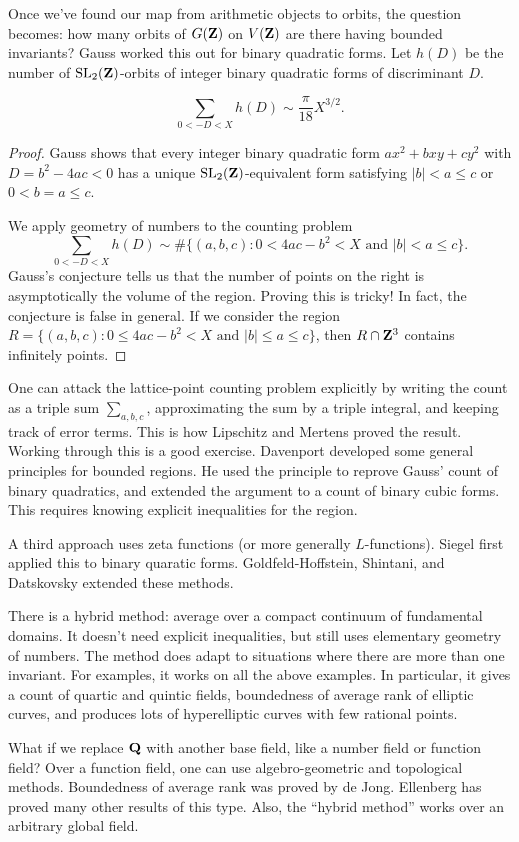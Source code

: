 Once we've found our map from arithmetic objects to orbits, the question 
becomes: how many orbits of $G(\mathbf{Z})$ on $V(\mathbf{Z})$ are there having bounded 
invariants? Gauss worked this out for binary quadratic forms. Let $h(D)$ be 
the number of $\operatorname{SL}_2(\mathbf{Z})$-orbits of integer binary quadratic forms of 
discriminant $D$. 

\begin{theo}
\[
  \sum_{0<-D<X} h(D) \sim \frac{\pi}{18} X^{3/2} .
\]
\end{theo}
\begin{proof}
Gauss shows that every integer binary quadratic form $a x^2+b x y+c y^2$ 
with $D=b^2-4 a c<0$ has a unique $\operatorname{SL}_2(\mathbf{Z})$-equivalent form 
satisfying $|b|<a\leqslant c$ or $0<b=a\leqslant c$. 

We apply geometry of numbers to the counting problem 
\[
  \sum_{0<-D<X} h(D) \sim \# \{(a,b,c):0<4 a c-b^2<X\text{ and }|b|<a\leqslant c\} .
\]
Gauss's conjecture tells us that the number of points on the right is 
asymptotically the volume of the region. Proving this is tricky! In fact, the 
conjecture is false in general. If we consider the region 
$R=\{(a,b,c):0\leqslant 4 a c-b^2<X\text{ and }|b|\leqslant a \leqslant c\}$, 
then $R\cap \mathbf{Z}^3$ contains infinitely points. 
\end{proof}

One can attack the lattice-point counting problem explicitly by writing the 
count as a triple sum $\sum_{a,b,c}$, approximating the sum by a triple 
integral, and keeping track of error terms. This is how Lipschitz and Mertens 
proved the result. Working through this is a good exercise. Davenport developed 
some general principles for bounded regions. He used the principle to reprove 
Gauss' count of binary quadratics, and extended the argument to a count of 
binary cubic forms. This requires knowing explicit inequalities for the region. 

A third approach uses zeta functions (or more generally $L$-functions). 
Siegel first applied this to binary quaratic forms. Goldfeld-Hoffstein, 
Shintani, and Datskovsky extended these methods. 

There is a hybrid method: average over a compact continuum of fundamental 
domains. It doesn't need explicit inequalities, but still uses elementary 
geometry of numbers. The method does adapt to situations where there are more 
than one invariant. For examples, it works on all the above examples. In 
particular, it gives a count of quartic and quintic fields, boundedness of 
average rank of elliptic curves, and produces lots of hyperelliptic curves with 
few rational points. 

What if we replace $\mathbf{Q}$ with another base field, like a number field or 
function field? Over a function field, one can use algebro-geometric and 
topological methods. Boundedness of average rank was proved by de Jong. 
Ellenberg has proved many other results of this type. Also, the ``hybrid 
method'' works over an arbitrary global field. %




